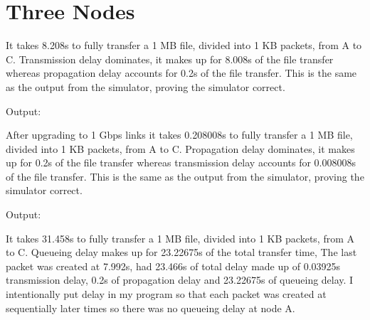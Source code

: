 \documentclass[11pt]{article}
\begin{document}


\vspace{1.0cm}

\section{Three Nodes}

It takes 8.208s to fully transfer a 1 MB file, divided into 1 KB packets, from A to C. Transmission delay dominates, it makes up for 8.008s of the file transfer whereas propagation delay accounts for 0.2s of the file transfer. This is the same as the output from the simulator, proving the simulator correct.



\vspace{1.0cm}

\noindent Output:



\vspace{1.0cm}

After upgrading to 1 Gbps links it takes 0.208008s to fully transfer a 1 MB file, divided into 1 KB packets, from A to C. Propagation delay dominates, it makes up for 0.2s of the file transfer whereas transmission delay accounts for 0.008008s of the file transfer. This is the same as the output from the simulator, proving the simulator correct.



\vspace{1.0cm}

\noindent Output:



\vspace{1.0cm}

It takes 31.458s to fully transfer a 1 MB file, divided into 1 KB packets, from A to C. Queueing delay makes up for 23.22675s of the total transfer time, The last packet was created at 7.992s, had 23.466s of total delay made up of 0.03925s transmission delay, 0.2s of propagation delay and 23.22675s of queueing delay. I intentionally put delay in my program so that each packet was created at sequentially later times so there was no queueing delay at node A.
\end{document}
